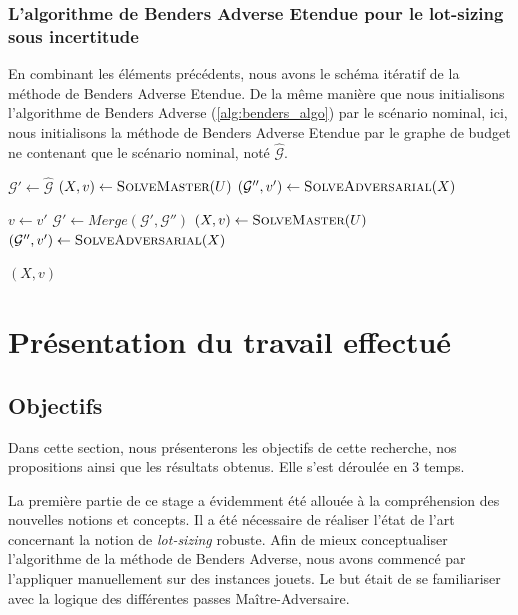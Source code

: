 \documentclass[12pt, a4paper, twoside]{report}
\numberwithin{equation}{section}
\begin{document}
	\subsubsection{L’algorithme de Benders Adverse Etendue pour le lot-sizing sous incertitude }
	
	En combinant les éléments précédents, nous avons le schéma itératif de la méthode de Benders Adverse Etendue. De la même manière que nous initialisons l'algorithme de Benders Adverse (\ref{alg:benders_algo}) par le scénario nominal, ici, nous initialisons la méthode de Benders Adverse Etendue par le graphe de budget ne contenant que le scénario nominal, noté $\hat{\mathcal{G}}$.
	
	\begin{algorithm}[H]
		\caption{Extended Adversarial Benders Method}
		\label{alg:benders_algo_etendue}
		\begin{algorithmic}[1]
			\State $\mathcal{G}' \gets \hat{\mathcal{G}}$
			\State $(X,v) \gets \Call{SolveMaster}{U}$
			\State $(\mathcal{G}'',v') \gets \Call{SolveAdversarial}{X}$
			
			\State $v \gets v'$
			\State $\mathcal{G}' \gets Merge(\mathcal{G}', \mathcal{G}'')$
			\State $(X,v) \gets \Call{SolveMaster}{U}$
			\State $(\mathcal{G}'',v') \gets \Call{SolveAdversarial}{X}$
			\EndWhile
			
			\State \Return $(X,v)$
		\end{algorithmic}
	\end{algorithm}
	
	\clearpage
	\section{Présentation du travail effectué}
	
	\subsection{Objectifs}
	
	Dans cette section, nous présenterons les objectifs de cette recherche, nos propositions ainsi que les résultats obtenus. Elle s'est déroulée en 3 temps.
	
	La première partie de ce stage a évidemment été allouée à la compréhension des nouvelles notions et concepts. Il a été nécessaire de réaliser l'état de l'art concernant la notion de \textit{lot-sizing} robuste. Afin de mieux conceptualiser l'algorithme de la méthode de Benders Adverse, nous avons commencé par l'appliquer manuellement sur des instances jouets. Le but était de se familiariser avec la logique des différentes passes Maître-Adversaire.
	
\end{document}
